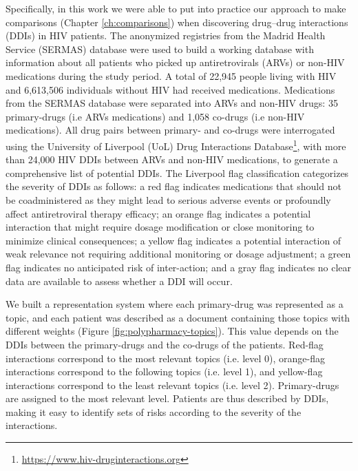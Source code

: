 Specifically, in this work we were able to put into practice our approach to make comparisons (Chapter \ref{ch:comparisons}) when discovering drug–drug interactions (DDIs) in HIV patients. The anonymized registries from the Madrid Health Service (SERMAS) database were used to build a working database with information about all patients who picked up antiretrovirals (ARVs) or non-HIV medications during the study period. A total of 22,945 people living with HIV and 6,613,506 individuals without HIV had received medications. Medications from the SERMAS database were separated into ARVs and non-HIV drugs: 35 primary-drugs (i.e ARVs medications) and 1,058 co-drugs (i.e non-HIV medications). All drug pairs between primary- and co-drugs were interrogated using the University of Liverpool (UoL) Drug Interactions Database\footnote{\url{https://www.hiv-druginteractions.org}}, with more than 24,000 HIV DDIs between ARVs and non-HIV medications, to generate a comprehensive list of potential DDIs. The Liverpool flag classification  categorizes the severity of DDIs as follows: a red flag indicates medications that should not be coadministered as they might lead to serious adverse events or profoundly affect antiretroviral therapy efficacy; an orange flag indicates a potential interaction that might require dosage modification or close monitoring to minimize clinical consequences; a yellow flag indicates a potential interaction of weak relevance not requiring additional monitoring or dosage adjustment; a green flag indicates no anticipated risk of inter-action; and a gray flag indicates no clear data are available to assess whether a DDI will occur.

We built a representation system where each primary-drug was represented as a topic, and each patient was described as a document containing those topics with different weights (Figure \ref{fig:polypharmacy-topics}). This value depends on the DDIs between the primary-drugs and the co-drugs of the patients. Red-flag interactions correspond to the most relevant topics (i.e. level 0), orange-flag interactions correspond to the following topics (i.e. level 1), and yellow-flag interactions correspond to the least relevant topics (i.e. level 2). Primary-drugs are assigned to the most relevant level. Patients are thus described by DDIs, making it easy to identify sets of risks according to the severity of the interactions.


